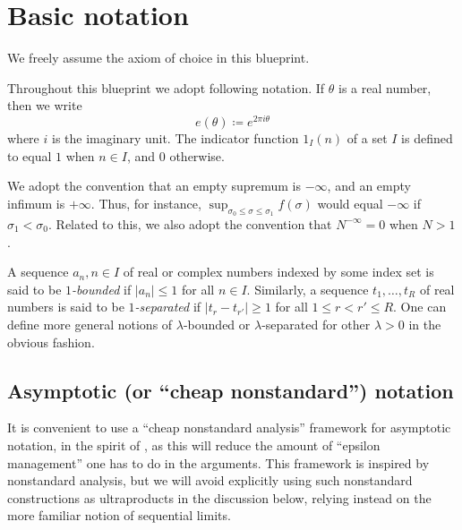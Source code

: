 \chapter{Basic notation}

We freely assume the axiom of choice in this blueprint.

Throughout this blueprint we adopt following notation. If $\theta$ is a real number, then we write
$$ e(\theta) \coloneqq e^{2\pi i\theta}$$
where $i$ is the imaginary unit. The indicator function $1_I(n)$ of a set $I$ is defined to equal $1$ when $n \in I$, and $0$ otherwise.

We adopt the convention that an empty supremum is $-\infty$, and an empty infimum is $+\infty$.  Thus, for instance, $\sup_{\sigma_0 \leq \sigma \leq \sigma_1} f(\sigma)$ would equal $-\infty$ if $\sigma_1 < \sigma_0$.  Related to this, we also adopt the convention that $N^{-\infty}=0$ when $N > 1$.

A sequence $a_n, n \in I$ of real or complex numbers indexed by some index set is said to be \emph{$1$-bounded} if $|a_n| \leq 1$ for all $n \in I$.  Similarly, a sequence $t_1,\dots,t_R$ of real numbers is said to be \emph{$1$-separated} if $|t_r-t_{r'}| \geq 1$ for all $1 \leq r < r' \leq R$.  One can define more general notions of $\lambda$-bounded or $\lambda$-separated for other $\lambda>0$ in the obvious fashion.

\section{Asymptotic (or ``cheap nonstandard'') notation}

It is convenient to use a ``cheap nonstandard analysis'' framework for asymptotic notation, in the spirit of \cite{tao-cheap}, as this will reduce the amount of ``epsilon management'' one has to do in the arguments.  This framework is inspired by nonstandard analysis, but we will avoid explicitly using such nonstandard constructions as ultraproducts in the discussion below, relying instead on the more familiar notion of sequential limits.

